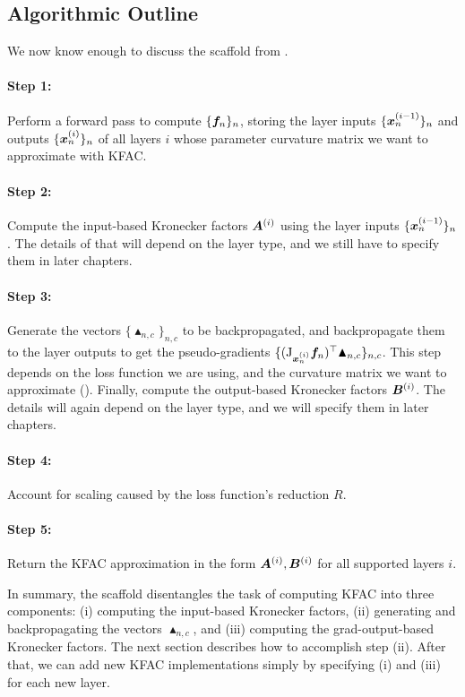 \subsection{Algorithmic Outline}

We now know enough to discuss the scaffold from .

\paragraph{Step 1:} Perform a forward pass to compute $\{{\bm{f}}_n\}_n $, storing the layer inputs $\{{\bm{x}}_n^{(i-1)} \}_n$ and outputs $\{{\bm{x}}_n^{(i)}\}_n$ of all layers $i$ whose parameter curvature matrix we want to approximate with KFAC.

\paragraph{Step 2:} Compute the input-based Kronecker factors ${\bm{A}}^{(i)}$ using the layer inputs $\{{\bm{x}}_n^{(i-1)}\}_n$.
The details of that will depend on the layer type, and we still have to specify them in later chapters.

\paragraph{Step 3:} Generate the vectors $\{\blacktriangle_{n,c}\}_{n,c}$ to be backpropagated, and backpropagate them to the layer outputs to get the pseudo-gradients $\{(\mathrm{J}_{{\bm{x}}_n^{(i)}} {\bm{f}}_n)^{\top} \blacktriangle_{n,c} \}_{n,c}$.
This step depends on the loss function we are using, and the curvature matrix we want to approximate ().
Finally, compute the output-based Kronecker factors ${\bm{B}}^{(i)}$.
The details will again depend on the layer type, and we will specify them in later chapters.

\paragraph{Step 4:} Account for scaling caused by the loss function's reduction $R$.

\paragraph{Step 5:} Return the KFAC approximation in the form ${\bm{A}}^{(i)}, {\bm{B}}^{(i)}$ for all supported layers $i$.

In summary, the scaffold disentangles the task of computing KFAC into three components: (i) computing the input-based Kronecker factors, (ii) generating and backpropagating the vectors $\blacktriangle_{n,c}$, and (iii) computing the grad-output-based Kronecker factors.
The next section describes how to accomplish step (ii).
After that, we can add new KFAC implementations simply by specifying (i) and (iii) for each new layer.

